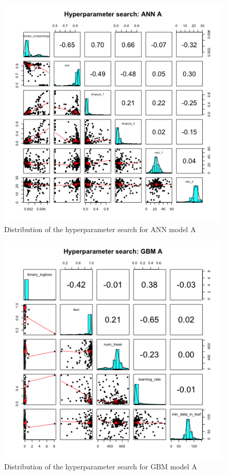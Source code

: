 \documentclass{article}
\begin{document}
\begin{figure}[H]
\centering
\includegraphics[width=0.9\linewidth]{splot_a_ann.png} 
\caption{Distribution of the hyperparameter search for ANN model A}
\label{splot_a_ann}
\end{figure}

\begin{figure}[H]
\centering
\includegraphics[width=0.9\linewidth]{splot_a_gbm.png} 
\caption{Distribution of the hyperparameter search for GBM model A}
\label{splot_a_gbm}
\end{figure}
\end{document}
